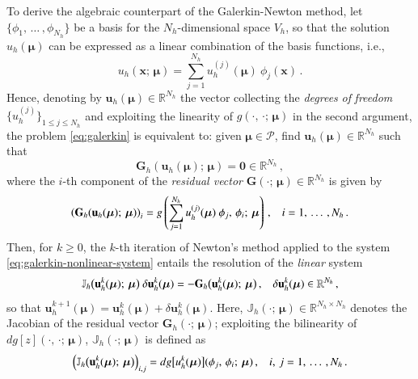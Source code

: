 \documentclass{elsarticle}
\numberwithin{equation}{section}
\theoremstyle{theorem}
\theoremstyle{definition}
\theoremstyle{remark}
\theoremstyle{proposition}
\numberwithin{figure}{section}
\newcommand{\bg}[1]{\boldsymbol{#1}}
\begin{document}
		To derive the algebraic counterpart of the Galerkin-Newton method, let $\big\lbrace \phi_1, \, \ldots \, , \phi_{N_h} \big\rbrace$ be a basis for the ${N_h}$-dimensional space $V_h$, so that the solution $u_h(\bg{\mu})$ can be expressed as a linear combination of the basis functions, i.e.,
		\begin{equation*}
			\label{eq:galerkin-solution}
			u_h(\bg{x}; \, \bg{\mu}) = \sum_{j = 1}^{N_h} u_h^{(j)}(\bg{\mu}) ~ \phi_j(\bg{x}) \, .
		\end{equation*} 
		Hence, denoting by $\mathbf{u}_h(\bg{\mu}) \in \mathbb{R}^{N_h}$ the vector collecting the \emph{degrees} \emph{of} \emph{freedom} $\big\lbrace u_h^{(j)} \big\rbrace_{1 \leq j \leq N_h}$ and exploiting the linearity of $g(\cdot, \, \cdot; \, \bg{\mu})$ in the second argument, the problem \eqref{eq:galerkin} is equivalent to: given $\bg{\mu} \in \mathcal{P}$, find $\mathbf{u}_h(\bg{\mu}) \in \mathbb{R}^{N_h}$ such that
		\begin{equation}
			\label{eq:galerkin-nonlinear-system}
			\mathbf{G}_h (\mathbf{u}_h(\bg{\mu}); \, \bg{\mu}) = \bg{0} \in \mathbb{R}^{N_h} \, ,
		\end{equation}
		where the $i$-th component of the \emph{residual vector} $\mathbf{G}(\cdot; \, \bg{\mu}) \in \mathbb{R}^{N_h}$ is given by
		\begin{equation}
			\label{eq:galerkin-nonlinear-system-equation}
			\left( \mathbf{G}_h(\mathbf{u}_h(\bg{\mu}); \, \bg{\mu}) \right)_i = g \left( \sum_{j = 1}^{N_h} u_h^{(j)}(\bg{\mu}) ~ \phi_j, \, \phi_i; \, \bg{\mu} \right) \, , \hspace*{0.3cm} i = 1, \, \ldots \, , {N_h} \, .
		\end{equation}
		Then, for $k \geq 0$, the $k$-th iteration of Newton's method applied to the system \eqref{eq:galerkin-nonlinear-system} entails the resolution of the \emph{linear} system
		\begin{equation}
			\label{eq:galerkin-linear-system}
			\mathbb{J}_h \big( \mathbf{u}^k_h(\bg{\mu}); \, \bg{\mu} \big) ~ \delta \mathbf{u}^k_h(\bg{\mu}) = - \mathbf{G}_h \big( \mathbf{u}^k_h(\bg{\mu}); \, \bg{\mu} \big) \, , \hspace*{0.3cm} \delta \mathbf{u}^k_h(\bg{\mu}) \in \mathbb{R}^{N_h} \, ,
		\end{equation}
		so that $\mathbf{u}^{k+1}_h(\bg{\mu}) = \mathbf{u}^k_h(\bg{\mu}) + \delta \mathbf{u}^k_h(\bg{\mu})$. Here, $\mathbb{J}_h(\cdot; \, \bg{\mu}) \in \mathbb{R}^{{N_h} \times {N_h}}$ denotes the Jacobian of the residual vector $\mathbf{G}_h(\cdot; \, \bg{\mu})$; exploiting the bilinearity of $dg[z](\cdot, \, \cdot; \, \bg{\mu})$, $\mathbb{J}_h(\cdot; \, \bg{\mu})$ is defined as
		\begin{equation*}
			\left( \mathbb{J}_h \big( \mathbf{u}^k_h(\bg{\mu}); \, \bg{\mu} \big) \right)_{i,j} = dg\big[u^k_h(\bg{\mu})\big](\phi_j, \, \phi_i; \, \bg{\mu}) \, , \hspace*{0.3cm} i, \, j = 1, \, \ldots \, , {N_h} \, .
		\end{equation*} 
		
\end{document}
